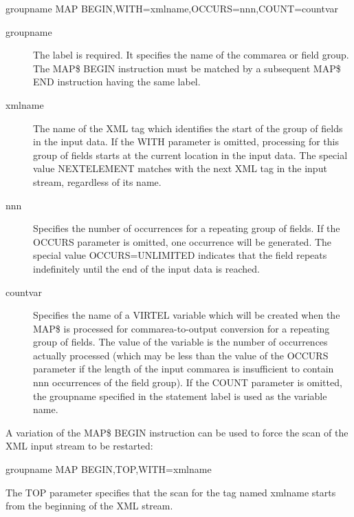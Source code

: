 \documentclass[letterpaper,10pt,english]{sphinxmanual}
\begin{document}
\begin{sphinxVerbatim}[commandchars=\\\{\}]
groupname MAP\PYGZdl{} BEGIN,WITH=\PYGZsq{}xmlname\PYGZsq{},OCCURS=nnn,COUNT=\PYGZsq{}countvar\PYGZsq{}
\end{sphinxVerbatim}
\begin{description}
\item[{groupname}] \leavevmode
The label is required. It specifies the name of the commarea or field group. The MAP\$ BEGIN instruction must be matched by a subsequent MAP\$ END instruction having the same label.

\item[{xmlname}] \leavevmode
The name of the XML tag which identifies the start of the group of fields in the input data. If the WITH parameter is omitted, processing for this group of fields starts at the current location in the input data. The special value NEXTELEMENT matches with the next XML tag in the input stream, regardless of its name.

\item[{nnn}] \leavevmode
Specifies the number of occurrences for a repeating group of fields. If the OCCURS parameter is omitted, one occurrence will be generated. The special value OCCURS=UNLIMITED indicates that the field repeats indefinitely until the end of the input data is reached.

\item[{countvar}] \leavevmode
Specifies the name of a VIRTEL variable which will be created when the MAP\$ is processed for commarea-to-output conversion for a repeating group of fields. The value of the variable is the number of occurrences actually processed (which may be less than the value of the OCCURS parameter if the length of the input commarea is insufficient to contain nnn occurrences of the field group). If the COUNT parameter is omitted, the groupname specified in the statement label is used as the variable name.

\end{description}

A variation of the MAP\$ BEGIN instruction can be used to force the scan of the XML input stream to be restarted:

\begin{sphinxVerbatim}[commandchars=\\\{\}]
groupname MAP\PYGZdl{} BEGIN,TOP,WITH=\PYGZsq{}xmlname\PYGZsq{}
\end{sphinxVerbatim}

The TOP parameter specifies that the scan for the tag named xmlname starts from the beginning of the XML stream.
\end{document}
